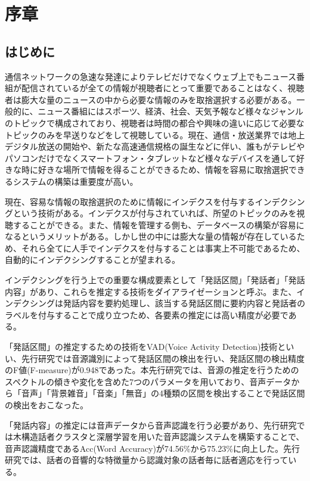 \chapter{序章}
\section{はじめに}
通信ネットワークの急速な発達によりテレビだけでなくウェブ上でもニュース番組が配信されているが全ての情報が視聴者にとって重要であることはなく、視聴者は膨大な量のニュースの中から必要な情報のみを取捨選択する必要がある。一般的に、ニュース番組にはスポーツ、経済、社会、天気予報など様々なジャンルのトピックで構成されており、視聴者は時間の都合や興味の違いに応じて必要なトピックのみを早送りなどをして視聴している。現在、通信・放送業界では地上デジタル放送の開始や、新たな高速通信規格の誕生などに伴い、誰もがテレビやパソコンだけでなくスマートフォン・タブレットなど様々なデバイスを通して好きな時に好きな場所で情報を得ることができるため、情報を容易に取捨選択できるシステムの構築は重要度が高い。\par

現在、容易な情報の取捨選択のために情報にインデクスを付与するインデクシングという技術がある。インデクスが付与されていれば、所望のトピックのみを視聴することができる。また、情報を管理する側も、データベースの構築が容易になるというメリットがある。しかし世の中には膨大な量の情報が存在しているため、それら全てに人手でインデクスを付与することは事実上不可能であるため、自動的にインデクシングすることが望まれる。\par

インデクシングを行う上での重要な構成要素として「発話区間」「発話者」「発話内容」があり、これらを推定する技術をダイアライゼーションと呼ぶ。また、インデクシングは発話内容を要約処理し、該当する発話区間に要約内容と発話者のラベルを付与することで成り立つため、各要素の推定には高い精度が必要である。\par

「発話区間」の推定するための技術をVAD(Voice Activity Detection)技術といい、先行研究\cite{yamaguchi_indexing}では音源識別によって発話区間の検出を行い、発話区間の検出精度のF値(F-measure)が0.948であった。本先行研究では、音源の推定を行うためのスペクトルの傾きや変化を含めた7つのパラメータを用いており、音声データから「音声」「背景雑音」「音楽」「無音」の4種類の区間を検出することで発話区間の検出をおこなった。\par

「発話内容」の推定には音声データから音声認識を行う必要があり、先行研究\cite{yoshimura_clustering}では木構造話者クラスタと深層学習を用いた音声認識システムを構築することで、音声認識精度であるAcc(Word Accuracy)が74.56\%から75.23\%に向上した。先行研究では、話者の音響的な特徴量から認識対象の話者毎に話者適応を行っている。\par


